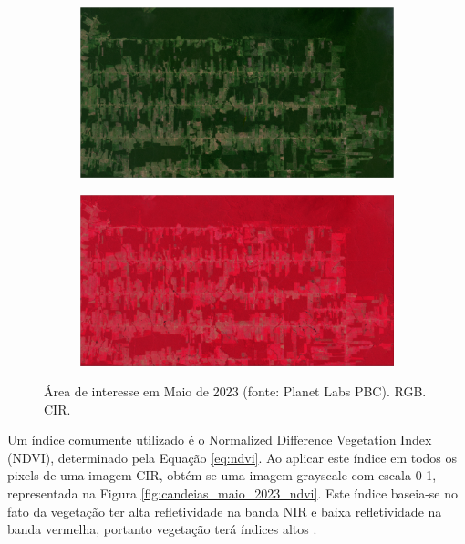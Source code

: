 \documentclass[11pt]{article}
\begin{document}
\begin{figure}[!htb]
	\centering
	\begin{subfigure}[b]{.8\textwidth}
		\centering
		\includegraphics[width=\textwidth]{candeias_maio_2023.png}
		\caption{}
		\label{fig:candeias_maio_2023_rgb}
	\end{subfigure}
	\begin{subfigure}[b]{.8\textwidth}
		\centering
		\includegraphics[width=\textwidth]{candeias_maio_2023_cir.png}
		\caption{}
		\label{fig:candeias_maio_2023_cir}
	\end{subfigure}
	
	\caption{Área de interesse em Maio de 2023 (fonte: Planet Labs PBC).  RGB.  CIR.}
	\label{fig:candeias_maio_2023}
\end{figure}

Um índice comumente utilizado é o Normalized Difference Vegetation Index (NDVI), determinado pela Equação \ref{eq:ndvi}. Ao aplicar este índice em todos os pixels de uma imagem CIR, obtém-se uma imagem grayscale com escala 0-1, representada na Figura \ref{fig:candeias_maio_2023_ndvi}. Este índice baseia-se no fato da vegetação ter alta refletividade na banda NIR e baixa refletividade na banda vermelha, portanto vegetação terá índices altos \cite{eos:cir:2023}.
\end{document}
